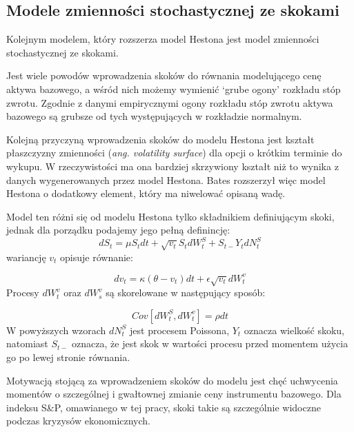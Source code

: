 \documentclass{pracamgr}
\begin{document}
\subsection{Modele zmienności stochastycznej ze skokami} %
\label{sec:modele_zmienno_ci_stochastycznej_ze_skokami}
 
Kolejnym modelem, który rozszerza model Hestona jest model zmienności stochastycznej ze skokami.

Jest wiele powodów wprowadzenia skoków do równania modelującego cenę aktywa bazowego, a wśród nich możemy wymienić `grube ogony' rozkładu stóp zwrotu. Zgodnie z danymi empirycznymi ogony rozkładu stóp zwrotu aktywa bazowego 
 są grubsze od tych występujących w rozkładzie normalnym.

Kolejną przyczyną wprowadzenia skoków do modelu Hestona jest kształt płaszczyzny zmienności 
(\textit{ang. volatility surface}) dla opcji o krótkim terminie do wykupu. W rzeczywistości ma ona bardziej 
skrzywiony kształt niż to wynika z danych wygenerowanych przez model Hestona. 
Bates  \cite{Bates} rozszerzył więc model Hestona o dodatkowy element, który ma niwelować opisaną wadę.

Model ten różni się od modelu Hestona tylko składnikiem definiującym skoki, jednak dla
porządku podajemy jego pełną definincję:
\begin{equation}
dS_t  = \mu S_t dt + \sqrt{v_t} S_t dW^S_t + S_{t-} Y_t dN_t^S
\end{equation}
wariancję $v_t$ opisuje równanie: 

\begin{equation}
dv_t  = \kappa (\theta - v_t)dt + \epsilon \sqrt{v_t} dW_t^v 
\end{equation}
Procesy $dW_t^v$ oraz $dW_s^v$ są skorelowane w następujący sposób:

\begin{equation}
Cov[dW^S_t, dW^v_t] = \rho dt 
\end{equation}
W powyższych wzorach $dN_t^S$ jest procesem Poissona, $Y_t$ oznacza wielkość skoku, natomiast $S_{t-}$ oznacza, że jest 
skok w wartości procesu przed momentem użycia go po lewej stronie równania.

Motywacją stojącą za wprowadzeniem skoków do modelu jest chęć uchwycenia momentów o 
szczególnej i gwałtownej zmianie ceny instrumentu bazowego. Dla indeksu S\&P, omawianego w tej pracy,
skoki takie są szczególnie widoczne podczas kryzysów ekonomicznych. 



 
\end{document}
